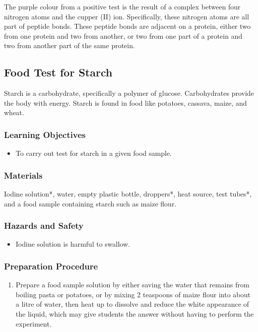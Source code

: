 The purple colour from a positive test is the result of a complex between four nitrogen atoms and the cupper (II) ion. Specifically, these nitrogen atoms are all part of peptide bonds. These peptide bonds are adjacent on a protein, either two from one protein and two from another, or two from one part of a protein and two from another part of the same protein.

\subsection{Food Test for Starch}
Starch is a carbohydrate, specifically a polymer of glucose. Carbohydrates provide the body with energy. Starch is found in food like potatoes, cassava, maize, and wheat.

\subsubsection*{Learning Objectives}
\begin{itemize}
\item{To carry out test for starch in a given food sample.}
\end{itemize}

\subsubsection*{Materials}
Iodine solution*, water, empty plastic bottle, droppers*, heat source, test tubes*, and a food sample containing starch such as maize flour.

\subsubsection*{Hazards and Safety}
\begin{itemize}
\item{Iodine solution is harmful to swallow.}
\end{itemize}

\subsubsection*{Preparation Procedure}
\begin{enumerate}
\item{Prepare a food sample solution by either saving the water that remains from boiling pasta or potatoes, or by mixing 2 teaspoons of maize flour into about a litre of water, then heat up to dissolve and reduce the white appearance of the liquid, which may give students the answer without having to perform the experiment.}
\end{enumerate}


